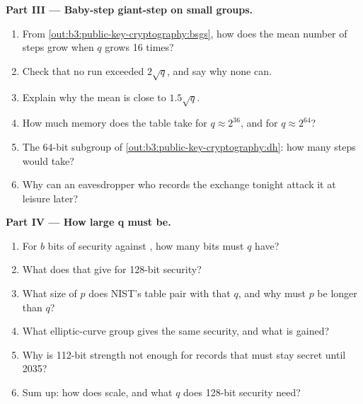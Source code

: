 \begin{problem}
\medskip\noindent\textbf{Part III --- Baby-step giant-step on small groups.}
\begin{enumerate}[resume]
  \item From \cref{out:b3:public-key-cryptography:bsgs}, how does the mean number of steps grow when $q$ grows 16 times?
  \item Check that no run exceeded $2\sqrt{q}$, and say why none can.
  \item Explain why the mean is close to $1.5\sqrt{q}$.
  \item How much memory does the table take for $q \approx 2^{36}$, and for $q \approx 2^{64}$?
  \item The 64-bit subgroup of \cref{out:b3:public-key-cryptography:dh}: how many steps would  take?
  \item Why can an eavesdropper who records the exchange tonight attack it at leisure later?
\end{enumerate}

\medskip\noindent\textbf{Part IV --- How large q must be.}
\begin{enumerate}[resume]
  \item For $b$ bits of security against , how many bits must $q$ have?
  \item What does that give for 128-bit security?
  \item What size of $p$ does NIST's table pair with that $q$, and why must $p$ be longer than $q$?
  \item What elliptic-curve group gives the same security, and what is gained?
  \item Why is 112-bit strength not enough for records that must stay secret until 2035?
  \item Sum up: how does  scale, and what $q$ does 128-bit security need?
\end{enumerate}
\end{problem}
